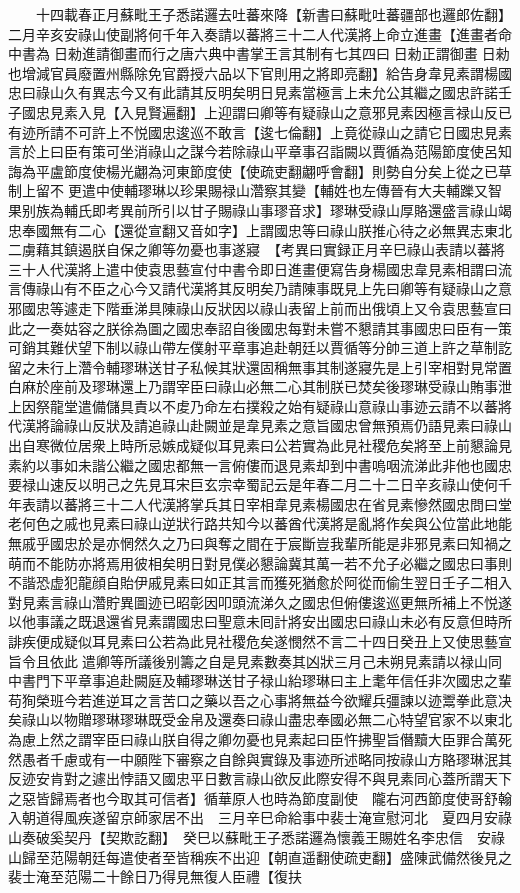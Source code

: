 　　十四載春正月蘇毗王子悉諾邏去吐蕃來降【新書曰蘇毗吐蕃疆部也邏郎佐翻】　二月辛亥安祿山使副將何千年入奏請以蕃將三十二人代漢將上命立進畫【進畫者命中書為日勑進請御畫而行之唐六典中書掌王言其制有七其四曰日勑正謂御畫日勑也增減官員廢置州縣除免官爵授六品以下官則用之將即亮翻】給告身韋見素謂楊國忠曰祿山久有異志今又有此請其反明矣明日見素當極言上未允公其繼之國忠許諾壬子國忠見素入見【入見賢遍翻】上迎謂曰卿等有疑祿山之意邪見素因極言禄山反已有迹所請不可許上不悦國忠逡巡不敢言【逡七倫翻】上竟從祿山之請它日國忠見素言於上曰臣有策可坐消祿山之謀今若除祿山平章事召詣闕以賈循為范陽節度使呂知誨為平盧節度使楊光翽為河東節度使【使疏吏翻翽呼會翻】則勢自分矣上從之已草制上留不更遣中使輔璆琳以珍果賜禄山濳察其變【輔姓也左傳晉有大夫輔躒又智果别族為輔氏即考異前所引以甘子賜祿山事璆音求】璆琳受祿山厚賂還盛言祿山竭忠奉國無有二心【還從宣翻又音如字】上謂國忠等曰祿山朕推心待之必無異志東北二虜藉其鎮遏朕自保之卿等勿憂也事遂寢　【考異曰實録正月辛巳祿山表請以蕃將三十人代漢將上遣中使袁思藝宣付中書令即日進畫便寫告身楊國忠韋見素相謂曰流言傳祿山有不臣之心今又請代漢將其反明矣乃請陳事既見上先曰卿等有疑祿山之意邪國忠等遽走下階垂涕具陳祿山反狀因以祿山表留上前而出俄頃上又令袁思藝宣曰此之一奏姑容之朕徐為圖之國忠奉詔自後國忠每對未嘗不懇請其事國忠曰臣有一策可銷其難伏望下制以祿山帶左僕射平章事追赴朝廷以賈循等分帥三道上許之草制訖留之未行上濳令輔璆琳送甘子私候其狀還固稱無事其制遂寢先是上引宰相對見常置白麻於座前及璆琳還上乃謂宰臣曰祿山必無二心其制朕已焚矣後璆琳受祿山賄事泄上因祭龍堂遣備儲具責以不䖍乃命左右撲殺之始有疑祿山意祿山事迹云請不以蕃將代漢將論祿山反狀及請追祿山赴闕並是韋見素之意旨國忠曾無預焉仍語見素曰祿山出自寒微位居衆上時所忌嫉成疑似耳見素曰公若實為此見社稷危矣將至上前懇論見素約以事如未諧公繼之國忠都無一言俯僂而退見素却到中書嗚咽流涕此非他也國忠要禄山速反以明己之先見耳宋巨玄宗幸蜀記云是年春二月二十二日辛亥祿山使何千年表請以蕃將三十二人代漢將掌兵其日宰相韋見素楊國忠在省見素慘然國忠問曰堂老何色之戚也見素曰祿山逆狀行路共知今以蕃酋代漢將是亂將作矣與公位當此地能無戚乎國忠於是亦惘然久之乃曰與奪之間在于宸斷豈我輩所能是非邪見素曰知禍之萌而不能防亦將焉用彼相矣明日對見僕必懇論冀其萬一若不允子必繼之國忠曰事則不諧恐虚犯龍顔自貽伊戚見素曰如正其言而獲死猶愈於阿從而偷生翌日壬子二相入對見素言祿山濳貯異圖迹已昭彰因叩頭流涕久之國忠但俯僂逡巡更無所補上不悦遂以他事議之既退還省見素謂國忠曰聖意未囘計將安出國忠曰祿山未必有反意但時所誹疾便成疑似耳見素曰公若為此見社稷危矣遂憫然不言二十四日癸丑上又使思藝宣旨令且依此遣卿等所議後别籌之自是見素數奏其凶狀三月己未朔見素請以禄山同中書門下平章事追赴闕庭及輔璆琳送甘子禄山紿璆琳曰主上耄年信任非次國忠之輩苟狥榮班今若進逆耳之言苦口之藥以吾之心事將無益今欲耀兵彊諫以迹鬻拳此意决矣祿山以物贈璆琳璆琳既受金帛及還奏曰祿山盡忠奉國必無二心特望官家不以東北為慮上然之謂宰臣曰祿山朕自得之卿勿憂也見素起曰臣忤拂聖旨僭黷大臣罪合萬死然愚者千慮或有一中願陛下審察之自餘與實錄及事迹所述略同按祿山方賂璆琳泯其反迹安肯對之遽出悖語又國忠平日數言祿山欲反此際安得不與見素同心蓋所謂天下之惡皆歸焉者也今取其可信者】循華原人也時為節度副使　隴右河西節度使哥舒翰入朝道得風疾遂留京師家居不出　三月辛巳命給事中裴士淹宣慰河北　夏四月安祿山奏破奚契丹【契欺訖翻】　癸巳以蘇毗王子悉諾邏為懷義王賜姓名李忠信　安祿山歸至范陽朝廷每遣使者至皆稱疾不出迎【朝直遥翻使疏吏翻】盛陳武備然後見之裴士淹至范陽二十餘日乃得見無復人臣禮【復扶